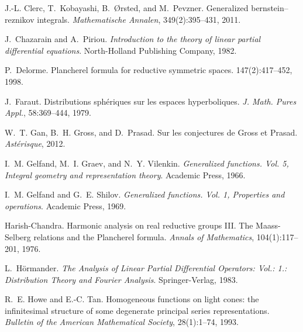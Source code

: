 \documentclass{article}
\newcommand{\tmtextit}[1]{{\itshape{#1}}}
\begin{document}
\begin{thebibliography}{CK{\O}P11}
  J.-L. Clerc, T.~Kobayashi,
  B.~{\O}rsted, and M.~Pevzner. {\newblock}Generalized bernstein--reznikov
  integrals. {\newblock}\tmtextit{Mathematische Annalen}, 349(2):395--431,
  2011.
  
  J.~Chazarain and A.~Piriou.
  {\newblock}\tmtextit{Introduction to the theory of linear partial
  differential equations}. {\newblock}North-Holland Publishing Company, 1982.
  
  P.~Delorme. {\newblock}Plancherel
  formula for reductive symmetric spaces. {\newblock}147(2):417--452, 1998.
  
  J.~Faraut. {\newblock}Distributions
  sph{\'e}riques sur les espaces hyperboliques. {\newblock}\tmtextit{J. Math.
  Pures Appl.}, 58:369--444, 1979.
  
  W.~T. Gan, B.~H. Gross, and D.~Prasad.
  {\newblock}Sur les conjectures de Gross et Prasad.
  {\newblock}\tmtextit{Ast{\'e}risque}, 2012.
  
  I.~M. Gelfand, M.~I. Graev, and N.~Y.
  Vilenkin. {\newblock}\tmtextit{Generalized functions. Vol. 5, Integral
  geometry and representation theory}. {\newblock}Academic Press, 1966.
  
  I.~M. Gelfand and G.~E. Shilov.
  {\newblock}\tmtextit{Generalized functions. Vol. 1, Properties and
  operations}. {\newblock}Academic Press, 1969.
  
  Harish-Chandra. {\newblock}Harmonic
  analysis on real reductive groups III. The Maass-Selberg relations and the
  Plancherel formula. {\newblock}\tmtextit{Annals of Mathematics},
  104(1):117--201, 1976.
  
  L.~H{\"o}rmander.
  {\newblock}\tmtextit{The Analysis of Linear Partial Differential Operators:
  Vol.: 1.: Distribution Theory and Fourier Analysis}.
  {\newblock}Springer-Verlag, 1983.
  
  R.~E. Howe and E.-C. Tan.
  {\newblock}Homogeneous functions on light cones: the infinitesimal structure
  of some degenerate principal series representations.
  {\newblock}\tmtextit{Bulletin of the American Mathematical Society},
  28(1):1--74, 1993.
  

\end{thebibliography}
\end{document}
